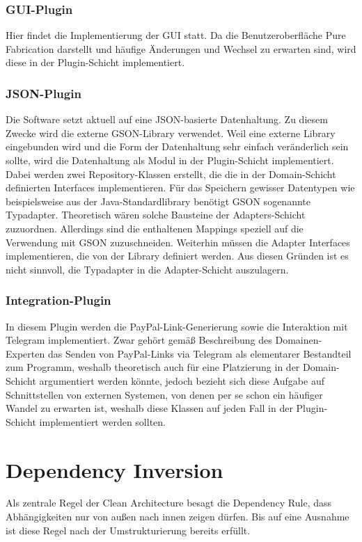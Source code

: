 \subsubsection{GUI-Plugin}
Hier findet die Implementierung der GUI statt.
Da die Benutzeroberfläche Pure Fabrication darstellt und häufige Änderungen und Wechsel zu erwarten sind, wird diese in der Plugin-Schicht implementiert.

\subsubsection{JSON-Plugin}
Die Software setzt aktuell auf eine JSON-basierte Datenhaltung.
Zu diesem Zwecke wird die externe GSON-Library verwendet.
Weil eine externe Library eingebunden wird und die Form der Datenhaltung sehr einfach veränderlich sein sollte, wird die Datenhaltung als Modul in der Plugin-Schicht implementiert.
Dabei werden zwei Repository-Klassen erstellt, die die in der Domain-Schicht definierten Interfaces implementieren.
Für das Speichern gewisser Datentypen wie beispielsweise  aus der Java-Standardlibrary benötigt GSON sogenannte Typadapter.
Theoretisch wären solche Bausteine der Adapters-Schicht zuzuordnen.
Allerdings sind die enthaltenen Mappings speziell auf die Verwendung mit GSON zuzuschneiden.
Weiterhin müssen die Adapter Interfaces implementieren, die von der Library definiert werden.
Aus diesen Gründen ist es nicht sinnvoll, die Typadapter in die Adapter-Schicht auszulagern.

\subsubsection{Integration-Plugin}
In diesem Plugin werden die PayPal-Link-Generierung sowie die Interaktion mit Telegram implementiert.
Zwar gehört gemäß Beschreibung des Domainen-Experten das Senden von PayPal-Links via Telegram als elementarer Bestandteil zum Programm, weshalb theoretisch auch für eine Platzierung in der Domain-Schicht argumentiert werden könnte, jedoch bezieht sich diese Aufgabe auf Schnittstellen von externen Systemen, von denen per se schon ein häufiger Wandel zu erwarten ist, weshalb diese Klassen auf jeden Fall in der Plugin-Schicht implementiert werden sollten.

\section{Dependency Inversion}
Als zentrale Regel der Clean Architecture besagt die Dependency Rule, dass Abhängigkeiten nur von außen nach innen zeigen dürfen.
Bis auf eine Ausnahme ist diese Regel nach der Umstrukturierung bereits erfüllt.

